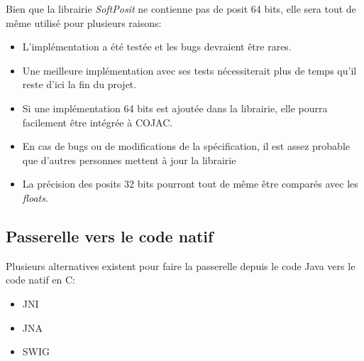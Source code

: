 Bien que la librairie \textit{SoftPosit} ne contienne pas de posit 64 bits, elle sera tout de même utilisé pour plusieurs raisons:
\begin{itemize}
    \item L'implémentation a été testée et les bugs devraient être rares.
    \item Une meilleure implémentation avec ses tests nécessiterait plus de temps qu'il reste d'ici la fin du projet.
    \item Si une implémentation 64 bits est ajoutée dans la librairie, elle pourra facilement être intégrée à COJAC.
    \item En cas de bugs ou de modifications de la spécification, il est assez probable que d'autres personnes mettent à jour la librairie
    \item La précision des posits 32 bits pourront tout de même être comparés avec les \textit{floats}.
\end{itemize}

\subsection{Passerelle vers le code natif}

Plusieurs alternatives existent pour faire la passerelle depuis le code Java vers le code natif en C:
\begin{itemize}
    \item JNI
    \item JNA
    \item SWIG
\end{itemize}

